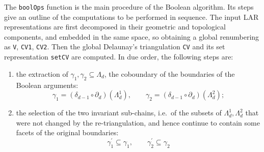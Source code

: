 \documentclass[11pt,oneside]{article}	%
\begin{document}
The \texttt{boolOps} function is the main procedure of the Boolean algorithm.
Its steps give an outline of the computations to be performed in sequence. The input LAR representations are first decomposed in their geometric and topological components, and embedded in the same space, so obtaining a global renumbering as \texttt{V}, \texttt{CV1}, \texttt{CV2}. Then the global Delaunay's triangulation \texttt{CV} and its set representation \texttt{setCV} are computed. In due order, the following steps are:  
\begin{enumerate}
\item 
the extraction of $\gamma_1,\gamma_2\subseteq\Lambda_d$, the coboundary of the boundaries of the Boolean arguments:
\[
\gamma_1 = (\delta_{d-1}\circ\partial_d) (\Lambda_d^1), \qquad
\gamma_2 = (\delta_{d-1}\circ\partial_d) (\Lambda_d^2);
\]  
\item 
the selection of the two invariant sub-chains, i.e.~of the subsets of $\Lambda_d^1, \Lambda_d^2$ that were not changed by the re-triangulation, and hence continue to contain some facets of the original boundaries:
\[
\gamma^{'}_1 \subseteq \gamma_1, \qquad
\gamma^{'}_2 \subseteq \gamma_2
\]
\end{enumerate}
\end{document}
